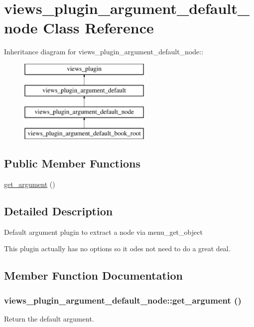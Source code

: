 \hypertarget{classviews__plugin__argument__default__node}{
\section{views\_\-plugin\_\-argument\_\-default\_\-node Class Reference}
\label{classviews__plugin__argument__default__node}
}
Inheritance diagram for views\_\-plugin\_\-argument\_\-default\_\-node::\begin{figure}[H]
\begin{center}
\leavevmode
\includegraphics[height=4cm]{classviews__plugin__argument__default__node}
\end{center}
\end{figure}
\subsection*{Public Member Functions}
\begin{DoxyCompactItemize}
\item 
\hyperlink{classviews__plugin__argument__default__node_a1191e03f5150b371f2fc5911726a4b60}{get\_\-argument} ()
\end{DoxyCompactItemize}


\subsection{Detailed Description}
Default argument plugin to extract a node via menu\_\-get\_\-object

This plugin actually has no options so it odes not need to do a great deal. 

\subsection{Member Function Documentation}
\hypertarget{classviews__plugin__argument__default__node_a1191e03f5150b371f2fc5911726a4b60}{
\subsubsection[{get\_\-argument}]{\setlength{\rightskip}{0pt plus 5cm}views\_\-plugin\_\-argument\_\-default\_\-node::get\_\-argument ()}}
\label{classviews__plugin__argument__default__node_a1191e03f5150b371f2fc5911726a4b60}
Return the default argument.


